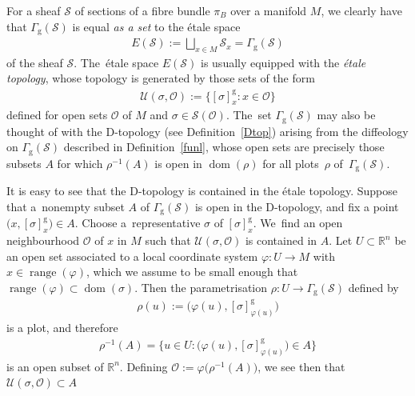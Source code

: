 \documentclass[pdftex]{sigma}
\numberwithin{equation}{section}
\def\g{\operatorname{g}}
\def\dom{\operatorname{dom}}
\def\range{\operatorname{range}}
\def\UU{{\mathcal{U}}}
\def\OO{{\mathcal{O}}}
\def\SS{{\mathscr{S}}}
\def\RB{{\mathbb{R}}}
\begin{document}
\begin{Remark}\label{relsheaf4}
For a sheaf $\SS$ of sections of a fibre bundle $\pi_{B}$ over a manifold $M$, we clearly have that $\Gamma_{\g}(\SS)$ is equal \textit{as a set} to the \'{e}tale space~\cite[p.~67]{hartshorne}
\begin{gather*}
E(\SS):=\bigsqcup_{x\in M}\SS_{x} = \Gamma_{\g}(\SS)
\end{gather*}
of the sheaf $\SS$. The~\'{e}tale space $E(\SS)$ is usually equipped with the \textit{\'{e}tale topology}, whose topology is generated by those sets of the form
\begin{gather*}
\UU(\sigma,\OO):=\big\{[\sigma]^{\g}_{x}\colon x\in\OO\big\}
\end{gather*}
defined for open sets $\OO$ of $M$ and $\sigma\in\SS(\OO)$. The~set $\Gamma_{\g}(\SS)$ may also be thought of with the D-topology (see Definition~\ref{Dtop}) arising from the diffeology on $\Gamma_{\g}(\SS)$ described in Definition~\ref{funl}, whose open sets are precisely those subsets $A$ for which $\rho^{-1}(A)$ is open in $\dom(\rho)$ for all plots~$\rho$ of~$\Gamma_{\g}(\SS)$.

It is easy to see that the D-topology is contained in the \'{e}tale topology. Suppose that a~non\-empty subset $A$ of $\Gamma_{\g}(\SS)$ is open in the D-topology, and fix a point $\big(x,[\sigma]_{x}^{\g}\big)\in A$. Choose a~representative $\sigma$ of $[\sigma]_{x}^{\g}$. We~find an open neighbourhood $\OO$ of $x$ in $M$ such that $\UU(\sigma,\OO)$ is contained in $A$. Let $U\subset\RB^{n}$ be an open set associated to a local coordinate system $\varphi\colon U\rightarrow M$ with $x\in\range(\varphi)$, which we assume to be small enough that $\range(\varphi)\subset\dom(\sigma)$. Then the parametrisation $\rho\colon U\rightarrow\Gamma_{\g}(\SS)$ defined by
\begin{gather*}
\rho(u):=\big(\varphi(u),[\sigma]^{\g}_{\varphi(u)}\big)
\end{gather*}
is a plot, and therefore
\begin{gather*}
\rho^{-1}(A) = \big\{u\in U\colon \big(\varphi(u),[\sigma]^{\g}_{\varphi(u)}\big)\in A\big\}
\end{gather*}
is an open subset of $\RB^{n}$. Defining $\OO:=\varphi\big(\rho^{-1}(A)\big)$, we see then that $\UU(\sigma,\OO)\subset A$


\end{Remark}
\end{document}
